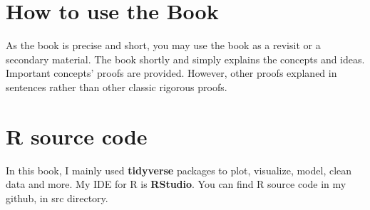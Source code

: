 \section*{How to use the Book}
As the book is precise and short, you may use the book as a revisit or a secondary material. The book shortly and simply explains the concepts and ideas. Important concepts' proofs are provided. However, other proofs explaned in sentences rather than other classic rigorous proofs.

\section*{R source code}
In this book, I mainly used \textbf{tidyverse} packages to plot, visualize, model, clean data and more. My IDE for R is \textbf{RStudio}. You can find R source code in my github, in src directory.
